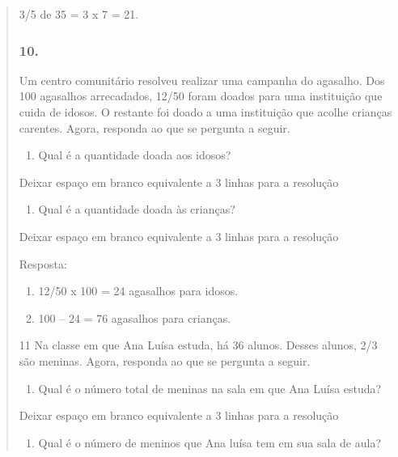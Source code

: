 \begin{enumerate}
\begin{escolha}
\begin{enumerate}
\begin{itemize}
\begin{itemize}
\begin{escolha}
\begin{quote}
\begin{escolha}
{3/5 de 35 = 3 x 7 = 21.

\subsubsection{10.}\label{section-113}

Um centro comunitário resolveu realizar uma campanha do agasalho. Dos
100 agasalhos arrecadados, 12/50 foram doados para uma instituição que
cuida de idosos. O restante foi doado a uma instituição que acolhe
crianças carentes. Agora, responda ao que se pergunta a seguir.

\begin{enumerate}
\def\labelenumi{\alph{enumi})}
\item
  Qual é a quantidade doada aos idosos?
\end{enumerate}

Deixar espaço em branco equivalente a 3 linhas para a resolução

\begin{enumerate}
\def\labelenumi{\alph{enumi})}
\item
  Qual é a quantidade doada às crianças?
\end{enumerate}

Deixar espaço em branco equivalente a 3 linhas para a resolução

Resposta:

\begin{enumerate}
\def\labelenumi{\alph{enumi})}
\item
  12/50 x 100 = 24 agasalhos para idosos.
\item
  100 -- 24 = 76 agasalhos para crianças.
\end{enumerate}

\num{11} Na classe em que Ana Luísa estuda, há 36 alunos. Desses alunos, 2/3
são meninas. Agora, responda ao que se pergunta a seguir.

\begin{enumerate}
\def\labelenumi{\alph{enumi})}
\item
  Qual é o número total de meninas na sala em que Ana Luísa estuda?
\end{enumerate}

Deixar espaço em branco equivalente a 3 linhas para a resolução

\begin{enumerate}
\def\labelenumi{\alph{enumi})}
\item
  Qual é o número de meninos que Ana luísa tem em sua sala de
  aula?
\end{enumerate}

}
\end{escolha}
\end{quote}
\end{escolha}
\end{itemize}
\end{itemize}
\end{enumerate}
\end{escolha}
\end{enumerate}
